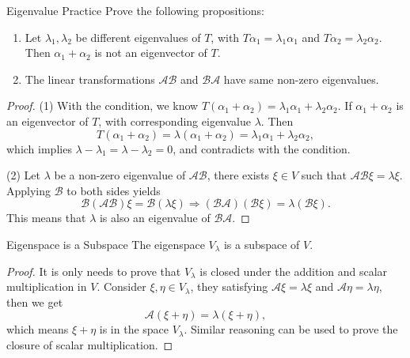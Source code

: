 \begin{example}{Eigenvalue Practice}{}
  Prove the following propositions:
  \begin{enumerate}
  \item Let $\lambda_1, \lambda_2$ be different eigenvalues of $T$, with
    $T \alpha_1 = \lambda_1 \alpha_1$ and $T \alpha_2 = \lambda_2 \alpha_2$.
    Then $\alpha_1 + \alpha_2$ is not an eigenvector of $T$.
  \item The linear transformations $\mathcal{A}\mathcal{B}$ and $\mathcal{B}\mathcal{A}$
    have same non-zero eigenvalues.
  \end{enumerate}
\end{example}

\begin{proof}
  (1) With the condition, we know $T(\alpha_1 + \alpha_2) = \lambda_1 \alpha_1 +
  \lambda_2 \alpha_2$. If $\alpha_1 + \alpha_2$ is an eigenvector of $T$,
  with corresponding eigenvalue $\lambda$. Then
  \begin{equation}
    T(\alpha_1 + \alpha_2) = \lambda(\alpha_1 + \alpha_2) = \lambda_1 \alpha_1 + \lambda_2 \alpha_2,
  \end{equation}
  which implies $\lambda - \lambda_1 = \lambda - \lambda_2 = 0$, and contradicts
  with the condition.

  (2) Let $\lambda$ be a non-zero eigenvalue of $\mathcal{A}\mathcal{B}$,
  there exists $\xi \in V$ such that $\mathcal{A}\mathcal{B} \xi = \lambda \xi$.
  Applying $\mathcal{B}$ to both sides yields
  \begin{equation}
    \mathcal{B}(\mathcal{A}\mathcal{B})\xi = \mathcal{B}(\lambda \xi)
    \Rightarrow (\mathcal{B}\mathcal{A})(\mathcal{B}\xi) = \lambda (\mathcal{B}\xi).
  \end{equation}
  This means that $\lambda$ is also an eigenvalue of $\mathcal{B}\mathcal{A}$.
\end{proof}

\begin{proposition}{Eigenspace is a Subspace}{}
  The eigenspace $V_{\lambda}$ is a subspace of $V$.
\end{proposition}

\begin{proof}
  It is only needs to prove that $V_{\lambda}$ is closed under the addition and
  scalar multiplication in $V$.
  Consider $\xi, \eta \in V_{\lambda}$, they satisfying $\mathcal{A}\xi =
  \lambda \xi$ and $\mathcal{A}\eta = \lambda \eta$,
  then we get
  \begin{equation}
    \mathcal{A}(\xi + \eta) = \lambda (\xi + \eta),
  \end{equation}
  which means $\xi + \eta$ is in the space $V_{\lambda}$.
  Similar reasoning can be used to prove the closure of scalar multiplication.
\end{proof}

